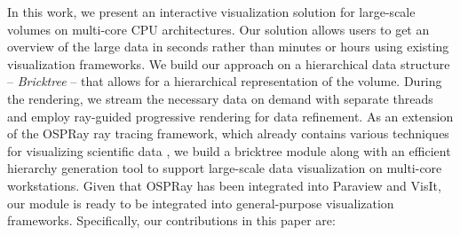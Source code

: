 



In this work, we present an interactive visualization solution for large-scale
volumes on multi-core CPU architectures. Our solution allows users to get an overview of the large
data in seconds rather than minutes or hours using existing visualization frameworks. 
We build our approach on a hierarchical data structure -- \textit{Bricktree} -- that allows
for a hierarchical representation of the volume. During the rendering, we stream the
necessary data on demand with separate threads and employ ray-guided progressive
rendering for data refinement. As an extension of the OSPRay ray tracing 
framework, which already contains various techniques for visualizing scientific data \cite{wald2017ospray,wang2018cpu}, we build a bricktree
module along with an efficient hierarchy generation tool to support large-scale data
visualization on multi-core workstations. Given that OSPRay has been integrated into
Paraview and VisIt, our module is ready to be integrated into general-purpose
visualization frameworks. Specifically, our contributions in this paper are:

